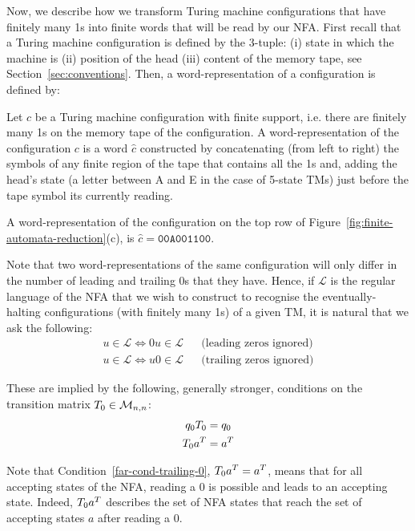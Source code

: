 Now, we describe how we transform Turing machine configurations that have finitely many 1s into finite words that will be read by our NFA. First recall that a Turing machine configuration is defined by the 3-tuple: (i) state in which the machine is (ii) position of the head (iii) content of the memory tape, see Section~\ref{sec:conventions}. Then, a word-representation of a configuration is defined by:

\begin{definition}\label{def:wordc}\normalfont
  Let $c$ be a Turing machine configuration with finite support, i.e. there are finitely many 1s on the memory tape of the configuration. A word-representation of the configuration $c$ is a word $\hat{c}$ constructed by concatenating (from left to right) the symbols of any finite region of the tape that contains all the 1s and, adding the head's state (a letter between A and E in the case of 5-state TMs) just before the tape symbol its currently reading.
\end{definition}

\begin{example}\normalfont
  A word-representation of the configuration on the top row of Figure~\ref{fig:finite-automata-reduction}(c), is $\hat{c} = \texttt{00A001100}$.
\end{example}

Note that two word-representations of the same configuration will only differ in the number of leading and trailing 0s that they have. Hence, if $\mathcal{L}$ is the regular language of the NFA that we wish to construct to recognise the eventually-halting configurations (with finitely many 1s) of a given TM, it is natural that we ask the following:
\begin{align*}
  u \in \mathcal{L} \iff 0u \in \mathcal{L} &  & \text{(leading zeros ignored)}
  \\
  u \in \mathcal{L} \iff u0 \in \mathcal{L} &  & \text{(trailing zeros ignored)}
\end{align*}

These are implied by the following, generally stronger, conditions on the transition matrix $T_0 \in \mathcal{M}_{n,n}$:
\begin{align}
  q_0 T_0    & = q_0
  \label{far-cond-leading-0}
  \\
  T_0 a^T & = a^T
  \label{far-cond-trailing-0}
\end{align}


Note that Condition~\ref{far-cond-trailing-0}, $T_0 a^T = a^T$, means that for all accepting states of the NFA, reading a 0 is possible and leads to an accepting state. Indeed, $T_0 a^T$ describes the set of NFA states that reach the set of accepting states $a$ after reading a $0$.


